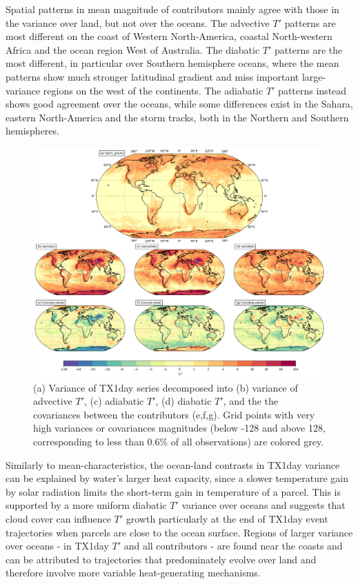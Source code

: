 \documentclass[11pt,a4paper,twoside,openright]{report}
\theoremstyle{definition}
\begin{document}
Spatial patterns in mean magnitude of contributors mainly agree with those in the variance over land, but not over the oceans. The advective \(T'\) patterns are most different on the coast of Western North-America, coastal North-western Africa and the ocean region West of Australia. The diabatic \(T'\) patterns are the most different, in particular over Southern hemisphere oceans, where the mean patterns show much stronger latitudinal gradient and miss important large-variance regions on the west of the continents. The adiabatic \(T'\) patterns instead shows good agreement over the oceans, while some differences exist in the Sahara, eastern North-America and the storm tracks, both in the Northern and Southern hemispheres.

\begin{figure}[h]
\includegraphics[width=1\linewidth]{images/vardecomp} \caption{(a) Variance of TX1day series decomposed into (b) variance of advective $T'$, (c) adiabatic $T'$, (d) diabatic $T'$, and the the covariances between the contributors (e,f,g). Grid points with very high variances or covariances magnitudes (below -128 and above 128, corresponding to less than 0.6\% of all observations) are colored grey.}\label{fig:vardecomp}
\end{figure}

Similarly to mean-characteristics, the ocean-land contrasts in TX1day variance can be explained by water's larger heat capacity, since a slower temperature gain by solar radiation limits the short-term gain in temperature of a parcel. This is supported by a more uniform diabatic \(T'\) variance over oceans and suggests that cloud cover can influence \(T'\) growth particularly at the end of TX1day event trajectories when parcels are close to the ocean surface. Regions of larger variance over oceans - in TX1day \(T'\) and all contributors - are found near the coasts and can be attributed to trajectories that predominately evolve over land and therefore involve more variable heat-generating mechanisms.
\end{document}
